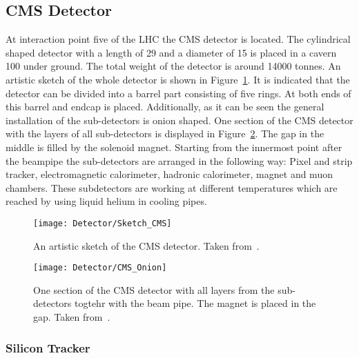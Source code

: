 \subsection{CMS Detector \label{LHCCMSCMSDet}}

At interaction point five of the LHC the CMS detector is located. The cylindrical shaped detector with a length of 29\m{} and a diameter of 15\m{} is placed in a cavern 100\m{} under ground. The total weight of the detector is around 14000 tonnes. An artistic sketch of the whole detector is shown in Figure~\ref{plot:LHCCMSWholeCMS}. It is indicated that the detector can be divided into a barrel part consisting of five rings. At both ends of this barrel and endcap is placed. Additionally, as it can be seen the general installation of the sub-detectors is onion shaped. One section of the CMS detector with the layers of all sub-detectors is displayed in Figure~\ref{plot:LHCCMSOnionCMS}. The gap in the middle is filled by the solenoid magnet. Starting from the innermost point after the beampipe the sub-detectors are arranged in the following way: Pixel and strip tracker, electromagnetic calorimeter, hadronic calorimeter, magnet and muon chambers. These subdetectors are working at different temperatures which are reached by using liquid helium in cooling pipes.

\begin{figure}[!Hhtb]
  \centering
  \texttt{[image: Detector/Sketch\_CMS]}
  \caption[Artistic sketch of the CMS detector]{An artistic sketch of the CMS detector. Taken from~. \label{plot:LHCCMSWholeCMS}}
\end{figure}

\begin{figure}[!Hhtb]
  \centering
  \texttt{[image: Detector/CMS\_Onion]}
  \caption[One section of the CMS detector with all layers]{One section of the CMS detector with all layers from the sub-detectors togtehr with the beam pipe. The magnet is placed in the gap. Taken from~. \label{plot:LHCCMSOnionCMS}}
\end{figure}

\subsubsection{Silicon Tracker}

